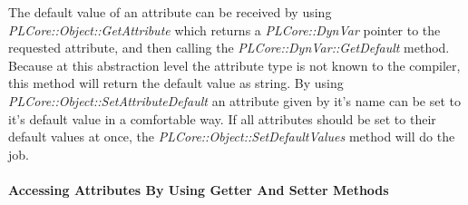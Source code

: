 The default value of an attribute can be received by using \emph{PLCore::Object::GetAttribute} which returns a \emph{PLCore::DynVar} pointer to the requested attribute, and then
calling the \emph{PLCore::DynVar::GetDefault} method. Because at this abstraction level the attribute type is not known to the compiler, this method will return the default value as string. By using \emph{PLCore::Object::SetAttributeDefault} an attribute given by it's name can be set to it's default value in a comfortable way. If all attributes should be set to their default values at once, the \emph{PLCore::Object::SetDefaultValues} method will do the job.


\paragraph{Accessing Attributes By Using Getter And Setter Methods}
